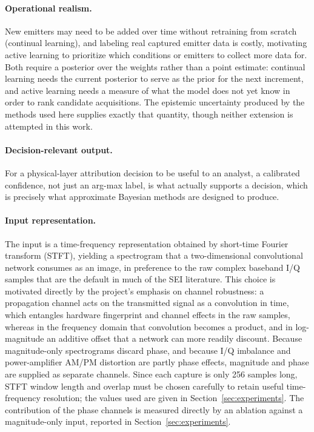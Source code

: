 \documentclass{article}
\begin{document}
\paragraph{Operational realism.}
New emitters may need to be added over time without retraining from scratch (continual
learning), and labeling real captured emitter data is costly, motivating active learning
to prioritize which conditions or emitters to collect more data for. Both require a
posterior over the weights rather than a point estimate: continual learning needs the
current posterior to serve as the prior for the next increment, and active learning needs
a measure of what the model does not yet know in order to rank candidate acquisitions.
The epistemic uncertainty produced by the methods used here supplies exactly that
quantity, though neither extension is attempted in this work.

\paragraph{Decision-relevant output.}
For a physical-layer attribution decision to be useful to an analyst, a calibrated
confidence, not just an arg-max label, is what actually supports a decision, which
is precisely what approximate Bayesian methods are designed to produce.

\paragraph{Input representation.}
The input is a time-frequency representation obtained by short-time Fourier transform
(STFT), yielding a spectrogram that a two-dimensional convolutional network consumes as
an image, in preference to the raw complex baseband I/Q samples that are the default in
much of the SEI literature. This choice is motivated directly by the project's emphasis
on channel robustness: a
propagation channel acts on the transmitted signal as a convolution in time, which
entangles hardware fingerprint and channel effects in the raw samples, whereas in the
frequency domain that convolution becomes a product, and in log-magnitude an additive
offset that a network can more readily discount. Because magnitude-only spectrograms
discard phase, and because I/Q imbalance and power-amplifier AM/PM distortion are partly
phase effects, magnitude and phase are supplied as separate channels. Since each
capture is only 256 samples long, STFT window length and overlap must be chosen
carefully to retain useful time-frequency resolution; the values used are given in
Section~\ref{sec:experiments}.
The contribution of the phase channels is measured directly by an ablation against a
magnitude-only input, reported in Section~\ref{sec:experiments}.
\end{document}
